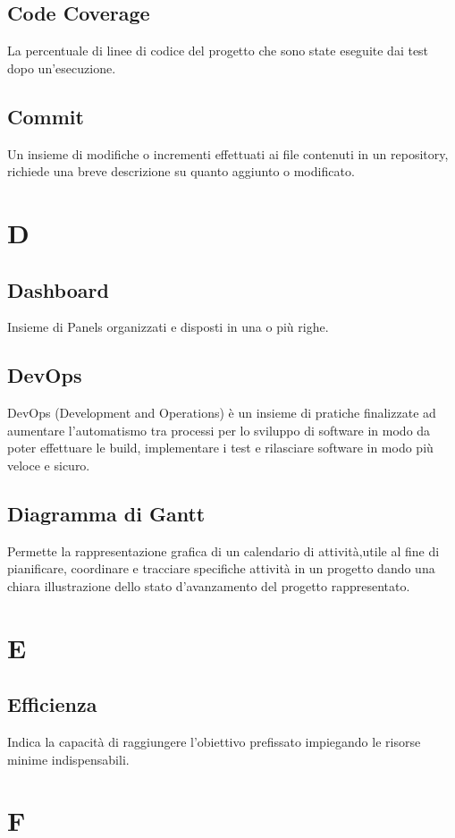     \subsection*{Code Coverage}
La percentuale di linee di codice del progetto che sono state eseguite dai test dopo un’esecuzione.
    \subsection*{Commit}
Un insieme di modifiche o incrementi effettuati ai file contenuti in un repository, richiede una breve descrizione su quanto aggiunto o modificato.
\newpage

\section{D}
    \subsection*{Dashboard}
Insieme di Panels organizzati e disposti in una o più righe.
    \subsection*{DevOps}
DevOps (Development and Operations) è un insieme di pratiche finalizzate ad aumentare l’automatismo tra processi per lo sviluppo di software in modo da poter effettuare le build, implementare i test e rilasciare software in modo più veloce e sicuro.
    \subsection*{Diagramma di Gantt}
Permette la rappresentazione grafica di un calendario di attività,utile al fine di pianificare, coordinare e tracciare specifiche attività in un progetto dando una chiara illustrazione dello stato d’avanzamento del progetto rappresentato.
\newpage

\section{E}
    \subsection*{Efficienza}
Indica la capacità di raggiungere l’obiettivo prefissato impiegando le risorse minime indispensabili.
\newpage
    
\section{F}
